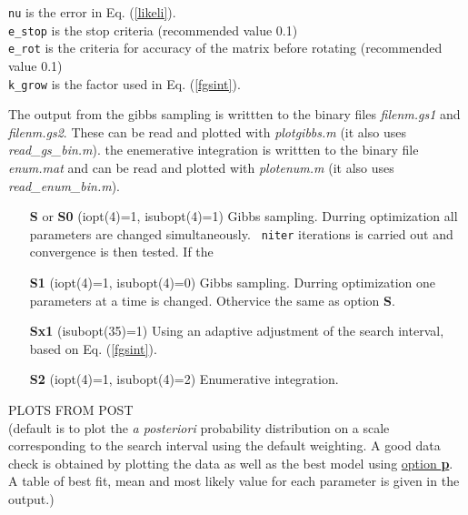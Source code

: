 \documentclass{saclantc}
\begin{document}
{\tt nu} is the error in Eq. (\ref{likeli}). \\
 {\tt e\_stop} is the stop criteria (recommended value 0.1) \\
{\tt e\_rot} is the  criteria for accuracy of the matrix before rotating 
(recommended value 0.1)\\
{\tt  k\_{grow}} is the factor used in  Eq. (\ref{fgsint}).

The output from the gibbs sampling is writtten to the binary files
{\it filenm.gs1}
and  {\it filenm.gs2}. These can be read and plotted with
{\it plotgibbs.m}
(it also uses {\it read\_gs\_bin.m}). the enemerative integration is
  writtten to the binary file {\it enum.mat} and can be read and plotted with
{\it plotenum.m}
(it also uses {\it read\_enum\_bin.m}).

\vspace{-0.6cm}
\begin{itemize}
    \item[{\bf S} or {\bf S0} ] (iopt(4)=1, isubopt(4)=1) Gibbs sampling. 
   Durring
    optimization all parameters are changed simultaneously. {\tt
   niter} iterations is carried out and convergence is then tested.
   If the  
    \item[{\bf S1}] (iopt(4)=1, isubopt(4)=0) Gibbs sampling.   Durring
    optimization one parameters at a time is changed. Othervice the
    same as option {\bf S}.
\item[{\bf Sx1}]   (isubopt(35)=1) Using an adaptive adjustment of the
  search interval, based on Eq. (\ref{fgsint}).
\item[{\bf S2}] (iopt(4)=1, isubopt(4)=2) Enumerative integration.\\
\end{itemize}
    
\noindent PLOTS FROM {\sf POST} \\
(default is to plot the {\it a posteriori} probability distribution on a
 scale corresponding to the search interval using the default weighting. 
 A good data check is obtained by plotting the data as well as the
best model using \underline{option {\bf p}}.
 A table of best fit, mean and most
likely value for each parameter is given in the output.)
\end{document}
